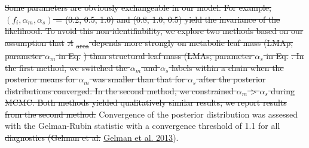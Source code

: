 \documentclass[
  12pt,
]{article}
\providecommand{\DIFaddtex}[1]{{\protect\color{blue}\uwave{#1}}} %
\providecommand{\DIFdeltex}[1]{{\protect\color{red}\sout{#1}}}                      %
\providecommand{\DIFaddbegin}{} %
\providecommand{\DIFaddend}{} %
\providecommand{\DIFdelbegin}{} %
\providecommand{\DIFdelend}{} %
\providecommand{\DIFadd}[1]{\texorpdfstring{\DIFaddtex{#1}}{#1}} %
\providecommand{\DIFdel}[1]{\texorpdfstring{\DIFdeltex{#1}}{}} %
\newcommand{\DIFscaledelfig}{0.5}
\newlength{\DIFdelgraphicswidth} %
\newlength{\DIFdelgraphicsheight} %
\newcommand{\DIFaddincludegraphics}[2][]{{\color{blue}\fbox{\DIFOincludegraphics[#1]{#2}}}} %
\newcommand{\DIFdelincludegraphics}[2][]{%
\sbox{\DIFdelgraphicsbox}{\DIFOincludegraphics[#1]{#2}}%
\settoboxwidth{\DIFdelgraphicswidth}{\DIFdelgraphicsbox} %
\settoboxtotalheight{\DIFdelgraphicsheight}{\DIFdelgraphicsbox} %
\scalebox{\DIFscaledelfig}{%
\parbox[b]{\DIFdelgraphicswidth}{\usebox{\DIFdelgraphicsbox}\\[-\baselineskip] \rule{\DIFdelgraphicswidth}{0em}}\llap{\resizebox{\DIFdelgraphicswidth}{\DIFdelgraphicsheight}{%
\setlength{\unitlength}{\DIFdelgraphicswidth}%
\begin{picture}(1,1)%
\thicklines\linethickness{2pt} %
{\color[rgb]{1,0,0}\put(0,0){\framebox(1,1){}}}%
{\color[rgb]{1,0,0}\put(0,0){\line( 1,1){1}}}%
{\color[rgb]{1,0,0}\put(0,1){\line(1,-1){1}}}%
\end{picture}%
}\hspace*{3pt}}} %
} %
\DeclareRobustCommand{\DIFaddbegin}{\DIFOaddbegin \let\includegraphics\DIFaddincludegraphics} %
\DeclareRobustCommand{\DIFaddend}{\DIFOaddend \let\includegraphics\DIFOincludegraphics} %
\DeclareRobustCommand{\DIFdelbegin}{\DIFOdelbegin \let\includegraphics\DIFdelincludegraphics} %
\DeclareRobustCommand{\DIFdelend}{\DIFOaddend \let\includegraphics\DIFOincludegraphics} %
\begin{document}
\DIFdel{Some parameters are obviously exchangeable in our model.
For example, \((f_i, \alpha_m, \alpha_s)\) = (0.2, 0.5, 1.0) and (0.8, 1.0, 0.5) yield the invariance of the likelihood.
To avoid this non-identifiability, we explore two methods based on our assumption that }\emph{\DIFdel{A}}%
\DIFdel{\textsubscript{area} depends more strongly on metabolic leaf mass (LMAp; parameter \(\alpha_m\) in Eq. }%
\DIFdel{) than structural leaf mass (LMAs; parameter \(\alpha_s\) in Eq. }%
\DIFdel{.
In the first method, we switched the \(\alpha_m\) and \(\alpha_s\) labels within a chain when the posterior means for \(\alpha_m\) was smaller than that for \(\alpha_s\) after the posterior distributions converged.
In the second method, we constrained \(\alpha_m\) \textgreater{} \(\alpha_s\) during MCMC.
Both methods yielded qualitatively similar results; we report results from the second method.
}\DIFdelend Convergence of the posterior distribution was assessed with the Gelman-Rubin statistic with a convergence threshold of 1.1 for all \DIFdelbegin \DIFdel{diagnostics (Gelman et al. }\DIFdelend \DIFaddbegin \DIFadd{parameters (}\DIFaddend \protect\DIFdelbegin %
\DIFdelend \DIFaddbegin \hyperlink{ref-Gelman2013}{Gelman et al. 2013}\DIFaddend ).
\end{document}
